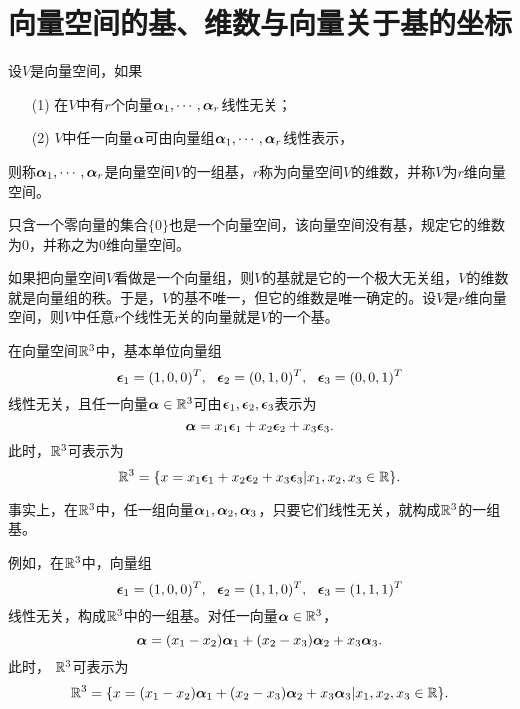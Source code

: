 \section{向量空间的基、维数与向量关于基的坐标}

\begin{frame}\ft{\secname}

\begin{dingyi}
  设$V$是向量空间，如果
  \begin{itemize}
  \item[(1)] 在$V$中有$r$个向量$\boldsymbol{\alpha}_1,\cdots,\boldsymbol{\alpha}_r$线性无关；
  \item[(2)] $V$中任一向量$\boldsymbol{\alpha}$可由向量组$\boldsymbol{\alpha}_1,\cdots,\boldsymbol{\alpha}_r$线性表示，
  \end{itemize}
  则称$\boldsymbol{\alpha}_1,\cdots,\boldsymbol{\alpha}_r$是向量空间$V$的一组基，$r$称为向量空间$V$的维数，并称$V$为$r$维向量空间。
\end{dingyi}
\end{frame}

\begin{frame}\ft{\secname}
\begin{zhu}
  只含一个零向量的集合$\{0\}$也是一个向量空间，该向量空间没有基，规定它的维数为$0$，并称之为$0$维向量空间。
\end{zhu}

\begin{zhu}
  如果把向量空间$V$看做是一个向量组，则$V$的基就是它的一个极大无关组，$V$的维数就是向量组的秩。于是，$V$的基不唯一，但它的维数是唯一确定的。设$V$是$r$维向量空间，则$V$中任意$r$个线性无关的向量就是$V$的一个基。
\end{zhu}
\end{frame}

\begin{frame}\ft{\secname}

\begin{li}
  在向量空间$\mathbb R^3$中，基本单位向量组
  $$
  \boldsymbol{\epsilon}_1=(1,0,0)^T,~~
  \boldsymbol{\epsilon}_2=(0,1,0)^T,~~
  \boldsymbol{\epsilon}_3=(0,0,1)^T
  $$
  线性无关，且任一向量$\boldsymbol{\alpha}\in \mathbb R^3$可由$\boldsymbol{\epsilon}_1,\boldsymbol{\epsilon}_2,\boldsymbol{\epsilon}_3$表示为
  $$
  \boldsymbol{\alpha}=x_1\boldsymbol{\epsilon}_1+x_2\boldsymbol{\epsilon}_2+x_3\boldsymbol{\epsilon}_3.
  $$
  此时，$\mathbb R^3$可表示为
  $$
  \mathbb R^3=\{x=x_1\boldsymbol{\epsilon}_1+x_2\boldsymbol{\epsilon}_2+x_3\boldsymbol{\epsilon}_3|x_1,x_2,x_3\in\mathbb R\}.
  $$
\end{li}

\end{frame}

\begin{frame}\ft{\secname}

  事实上，在$\mathbb R^3$中，任一组向量$\boldsymbol{\alpha}_1,\boldsymbol{\alpha}_2,\boldsymbol{\alpha}_3$，只要它们线性无关，就构成$\mathbb R^3$的一组基。\pause 


  例如，在$\mathbb R^3$中，向量组
$$
\boldsymbol{\epsilon}_1=(1,0,0)^T,~~
\boldsymbol{\epsilon}_2=(1,1,0)^T,~~
\boldsymbol{\epsilon}_3=(1,1,1)^T
$$
线性无关，构成$\mathbb R^3$中的一组基。对任一向量$\boldsymbol{\alpha}\in \mathbb R^3$，
$$
\boldsymbol{\alpha}=(x_1-x_2)\boldsymbol{\alpha}_1+(x_2-x_3)\boldsymbol{\alpha}_2+x_3\boldsymbol{\alpha}_3.
$$
此时，
$\mathbb R^3$可表示为
$$
\mathbb R^3=\{x=(x_1-x_2)\boldsymbol{\alpha}_1+(x_2-x_3)\boldsymbol{\alpha}_2+x_3\boldsymbol{\alpha}_3|x_1,x_2,x_3\in\mathbb R\}.
$$

\end{frame}

